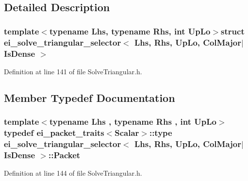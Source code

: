 \subsection{Detailed Description}
\subsubsection*{template$<$typename Lhs, typename Rhs, int Up\-Lo$>$struct ei\-\_\-solve\-\_\-triangular\-\_\-selector$<$ Lhs, Rhs, Up\-Lo, Col\-Major$|$\-Is\-Dense $>$}



Definition at line 141 of file Solve\-Triangular.\-h.



\subsection{Member Typedef Documentation}
\hypertarget{structei__solve__triangular__selector_3_01_lhs_00_01_rhs_00_01_up_lo_00_01_col_major_7_is_dense_01_4_a2b9d94b8bdf9a73359a63a2950ad475a}{
\subsubsection[{Packet}]{\setlength{\rightskip}{0pt plus 5cm}template$<$typename Lhs , typename Rhs , int Up\-Lo$>$ typedef {\bf ei\-\_\-packet\-\_\-traits}$<${\bf Scalar}$>$\-::{\bf type} {\bf ei\-\_\-solve\-\_\-triangular\-\_\-selector}$<$ Lhs, Rhs, Up\-Lo, {\bf Col\-Major}$|${\bf Is\-Dense} $>$\-::{\bf Packet}}}\label{structei__solve__triangular__selector_3_01_lhs_00_01_rhs_00_01_up_lo_00_01_col_major_7_is_dense_01_4_a2b9d94b8bdf9a73359a63a2950ad475a}


Definition at line 144 of file Solve\-Triangular.\-h.

